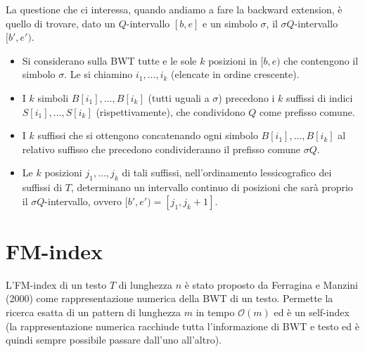 La questione che ci interessa, quando andiamo a fare la backward extension, è quello di trovare, dato un $Q$-intervallo $[b,e]$ e un simbolo $\sigma$, il $\sigma Q$-intervallo $[b',e')$.
\begin{itemize}
    \item Si considerano sulla BWT tutte e le sole $k$ posizioni in $[b,e)$ che contengono il simbolo $\sigma$.
    Le si chiamino $i_1, \dots, i_k$ (elencate in ordine crescente).
    \item I $k$ simboli $B[i_1], \dots, B[i_k]$ (tutti uguali a $\sigma$) precedono i $k$ suffissi di indici $S[i_1], \dots, S[i_k]$ (rispettivamente), che condividono $Q$ come prefisso comune.
    \item I $k$ suffissi che si ottengono concatenando ogni simbolo $B[i_1], \dots, B[i_k]$ al relativo suffisso che precedono condivideranno il prefisso comune   $\sigma Q$.
    \item Le $k$ posizioni $j_1, \dots, j_k$ di tali suffissi, nell’ordinamento lessicografico dei suffissi di $T$, determinano un intervallo continuo di posizioni che sarà proprio il $\sigma Q$-intervallo, ovvero $[b',e') = [j_1, j_k+1]$.
\end{itemize}



\section{FM-index}

L’FM-index di un testo $T$ di lunghezza $n$ è stato proposto da Ferragina e Manzini (2000) come rappresentazione numerica della BWT di un testo.
Permette la ricerca esatta di un pattern di lunghezza $m$ in tempo $\mathcal{O}(m)$ ed è un self-index (la rappresentazione numerica racchiude tutta l’informazione di BWT e testo ed è quindi sempre possibile passare dall’uno all’altro).

